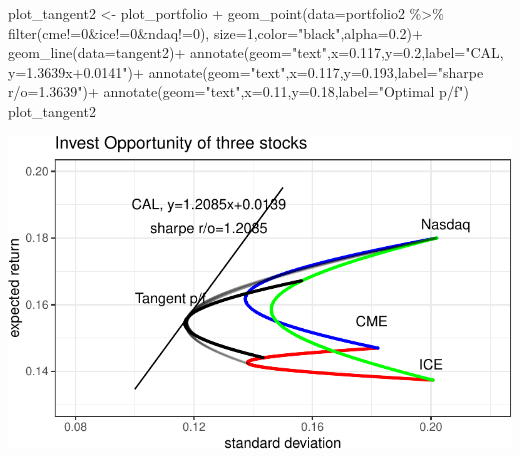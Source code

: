 \documentclass[
  a4paper,
  DIV=11,
  numbers=noendperiod]{scrreprt}
\newenvironment{Shaded}{\begin{snugshade}}{\end{snugshade}}
\newcommand{\AttributeTok}[1]{\textcolor[rgb]{0.40,0.45,0.13}{#1}}
\newcommand{\DecValTok}[1]{\textcolor[rgb]{0.68,0.00,0.00}{#1}}
\newcommand{\FloatTok}[1]{\textcolor[rgb]{0.68,0.00,0.00}{#1}}
\newcommand{\FunctionTok}[1]{\textcolor[rgb]{0.28,0.35,0.67}{#1}}
\newcommand{\NormalTok}[1]{\textcolor[rgb]{0.00,0.23,0.31}{#1}}
\newcommand{\OtherTok}[1]{\textcolor[rgb]{0.00,0.23,0.31}{#1}}
\newcommand{\SpecialCharTok}[1]{\textcolor[rgb]{0.37,0.37,0.37}{#1}}
\newcommand{\StringTok}[1]{\textcolor[rgb]{0.13,0.47,0.30}{#1}}
\begin{document}
\begin{Shaded}
\begin{Highlighting}[]
\NormalTok{plot\_tangent2 }\OtherTok{\textless{}{-}}\NormalTok{ plot\_portfolio }\SpecialCharTok{+}
  \FunctionTok{geom\_point}\NormalTok{(}\AttributeTok{data=}\NormalTok{portfolio2 }\SpecialCharTok{\%\textgreater{}\%} \FunctionTok{filter}\NormalTok{(cme}\SpecialCharTok{!=}\DecValTok{0}\SpecialCharTok{\&}\NormalTok{ice}\SpecialCharTok{!=}\DecValTok{0}\SpecialCharTok{\&}\NormalTok{ndaq}\SpecialCharTok{!=}\DecValTok{0}\NormalTok{),}
             \AttributeTok{size=}\DecValTok{1}\NormalTok{,}\AttributeTok{color=}\StringTok{"black"}\NormalTok{,}\AttributeTok{alpha=}\FloatTok{0.2}\NormalTok{)}\SpecialCharTok{+}
  \FunctionTok{geom\_line}\NormalTok{(}\AttributeTok{data=}\NormalTok{tangent2)}\SpecialCharTok{+}
  \FunctionTok{annotate}\NormalTok{(}\AttributeTok{geom=}\StringTok{"text"}\NormalTok{,}\AttributeTok{x=}\FloatTok{0.117}\NormalTok{,}\AttributeTok{y=}\FloatTok{0.2}\NormalTok{,}\AttributeTok{label=}\StringTok{"CAL, y=1.3639x+0.0141"}\NormalTok{)}\SpecialCharTok{+}
  \FunctionTok{annotate}\NormalTok{(}\AttributeTok{geom=}\StringTok{"text"}\NormalTok{,}\AttributeTok{x=}\FloatTok{0.117}\NormalTok{,}\AttributeTok{y=}\FloatTok{0.193}\NormalTok{,}\AttributeTok{label=}\StringTok{"sharpe r/o=1.3639"}\NormalTok{)}\SpecialCharTok{+}
  \FunctionTok{annotate}\NormalTok{(}\AttributeTok{geom=}\StringTok{"text"}\NormalTok{,}\AttributeTok{x=}\FloatTok{0.11}\NormalTok{,}\AttributeTok{y=}\FloatTok{0.18}\NormalTok{,}\AttributeTok{label=}\StringTok{"Optimal p/f"}\NormalTok{)}
\NormalTok{plot\_tangent2}
\end{Highlighting}
\end{Shaded}

\includegraphics{investment_hw2_files/figure-pdf/unnamed-chunk-9-1.pdf}
\end{document}
